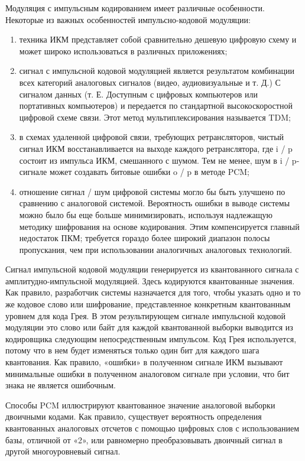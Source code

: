 \documentclass[12pt,a4paper,oneside]{report}
\begin{document}
Модуляция с импульсным кодированием имеет различные особенности. Некоторые из важных особенностей импульсно-кодовой модуляции:
\begin{enumerate}
	\item техника ИКМ представляет собой сравнительно дешевую цифровую схему и может широко использоваться в различных приложениях;
	\item сигнал с импульсной кодовой модуляцией является результатом комбинации всех категорий аналоговых сигналов (видео, аудиовизуальные и т. Д.) С сигналом данных (т. Е. Доступным с цифровых компьютеров или портативных компьютеров) и передается по стандартной высокоскоростной цифровой схеме связи. Этот метод мультиплексирования называется TDM;
	\item в схемах удаленной цифровой связи, требующих ретрансляторов, чистый сигнал ИКМ восстанавливается на выходе каждого ретранслятора, где i / p состоит из импульса ИКМ, смешанного с шумом. Тем не менее, шум в i / p-сигнале может создавать битовые ошибки o / p в методе PCM;
	\item отношение сигнал / шум цифровой системы могло бы быть улучшено по сравнению с аналоговой системой. Вероятность ошибки в выводе системы можно было бы еще больше минимизировать, используя надлежащую методику шифрования на основе кодирования. Этим компенсируется главный недостаток ПКМ; требуется гораздо более широкий диапазон полосы пропускания, чем при использовании аналогичных аналоговых технологий.
\end{enumerate}

Сигнал импульсной кодовой модуляции генерируется из квантованного сигнала с амплитудно-импульсной модуляцией. Здесь кодируются квантованные значения. Как правило, разработчик системы назначается для того, чтобы указать одно и то же кодовое слово или шифрование, представленное конкретным квантованным уровнем для кода Грея. В этом результирующем сигнале импульсной кодовой модуляции это слово или байт для каждой квантованной выборки выводится из кодировщика следующим непосредственным импульсом. Код Грея используется, потому что в нем будет изменяться только один бит для каждого шага квантования. Как правило, «ошибки» в полученном сигнале ИКМ вызывают минимальные ошибки в полученном аналоговом сигнале при условии, что бит знака не является ошибочным.

Способы PCM иллюстрируют квантованное значение аналоговой выборки двоичными кодами. Как правило, существует вероятность определения квантованных аналоговых отсчетов с помощью цифровых слов с использованием базы, отличной от «2», или равномерно преобразовывать двоичный сигнал в другой многоуровневый сигнал.
\end{document}
